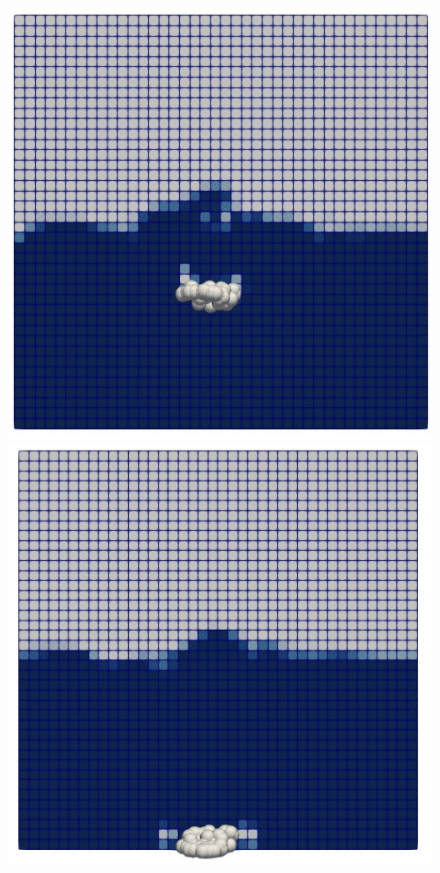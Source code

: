 \begin{figure}[H]
\begin{minipage}{.5\textwidth}
        \includegraphics[width=\linewidth]{Images/chap4/clump_2.png}
    \end{minipage}
    \newline
    \begin{minipage}{.5\textwidth}
        \centering
        \includegraphics[width=\linewidth]{Images/chap4/clump_3.png}

\end{minipage}
\end{figure}
